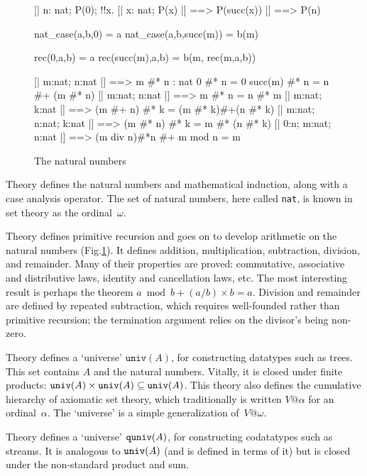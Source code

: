 \begin{figure}
\begin{ttbox}
    [| n: nat;  P(0);  !!x. [| x: nat;  P(x) |] ==> P(succ(x)) 
    |] ==> P(n)

    nat_case(a,b,0) = a
 nat_case(a,b,succ(m)) = b(m)

         rec(0,a,b) = a
      rec(succ(m),a,b) = b(m, rec(m,a,b))

     [| m:nat;  n:nat |] ==> m #* n : nat
        0 #* n = 0
     succ(m) #* n = n #+ (m #* n)
  [| m:nat; n:nat |] ==> m #* n = n #* m
 [| m:nat; k:nat |] ==> (m #+ n) #* k = (m #* k){\thinspace}#+{\thinspace}(n #* k)
    [| m:nat;  n:nat;  k:nat |] ==> (m #* n) #* k = m #* (n #* k)
    [| 0:n;  m:nat;  n:nat |] ==> (m div n)#*n #+ m mod n = m
\end{ttbox}
\caption{The natural numbers} \label{zf-nat}
\end{figure}

Theory  defines the natural numbers and mathematical
induction, along with a case analysis operator.  The set of natural
numbers, here called \texttt{nat}, is known in set theory as the ordinal~$\omega$.

Theory  defines primitive recursion and goes on to develop
arithmetic on the natural numbers (Fig.\ts\ref{zf-nat}).  It defines
addition, multiplication, subtraction, division, and remainder.  Many of
their properties are proved: commutative, associative and distributive
laws, identity and cancellation laws, etc.  The most interesting result is
perhaps the theorem $a \bmod b + (a/b)\times b = a$.  Division and
remainder are defined by repeated subtraction, which requires well-founded
rather than primitive recursion; the termination argument relies on the
divisor's being non-zero.

Theory  defines a `universe' $\texttt{univ}(A)$, for
constructing datatypes such as trees.  This set contains $A$ and the
natural numbers.  Vitally, it is closed under finite products: ${\tt
  univ}(A)\times{\tt univ}(A)\subseteq{\tt univ}(A)$.  This theory also
defines the cumulative hierarchy of axiomatic set theory, which
traditionally is written $V@\alpha$ for an ordinal~$\alpha$.  The
`universe' is a simple generalization of~$V@\omega$.

Theory  defines a `universe' ${\tt quniv}(A)$, for
constructing codatatypes such as streams.  It is analogous to ${\tt
  univ}(A)$ (and is defined in terms of it) but is closed under the
non-standard product and sum.

